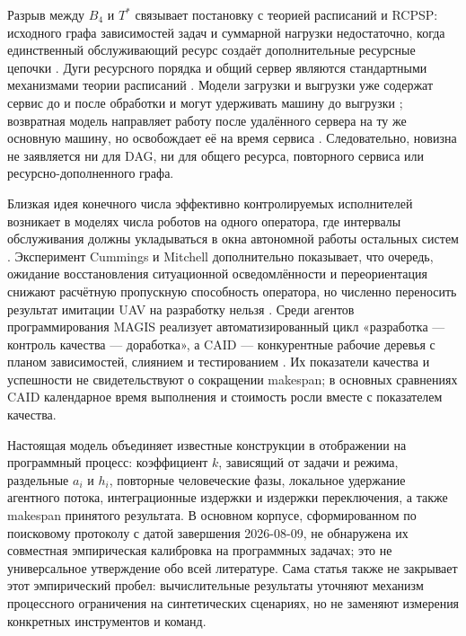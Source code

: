 Разрыв между $B_4$ и $T^*$ связывает постановку с теорией расписаний и RCPSP:
исходного графа зависимостей задач и суммарной нагрузки недостаточно, когда единственный
обслуживающий ресурс создаёт дополнительные ресурсные цепочки
\cite{graham1966bounds,brucker1999resource}. Дуги ресурсного порядка и общий
сервер являются стандартными механизмами теории расписаний
\cite{pinedo2008scheduling,hall2000parallel}. Модели загрузки и выгрузки уже
содержат сервис до и после обработки и могут удерживать машину до выгрузки
\cite{elidrissi2023loading}; возвратная модель направляет работу после удалённого
сервера на ту же основную машину, но освобождает её на время сервиса
\cite{chakhlevitch2009reentrant}. Следовательно, новизна не заявляется ни для
DAG, ни для общего ресурса, повторного сервиса или ресурсно-дополненного графа.

Близкая идея конечного числа эффективно контролируемых исполнителей возникает в
моделях числа роботов на одного оператора, где интервалы обслуживания должны укладываться в окна
автономной работы остальных систем \cite{olsen2004fanout,crandall2005validating}.
Эксперимент Cummings и Mitchell дополнительно показывает, что очередь,
ожидание восстановления ситуационной осведомлённости и переориентация снижают расчётную пропускную
способность оператора, но численно переносить результат имитации UAV на
разработку нельзя \cite{cummings2008predicting}. Среди агентов программирования
MAGIS реализует автоматизированный цикл «разработка --- контроль качества ---
доработка», а CAID --- конкурентные рабочие деревья с планом зависимостей,
слиянием и тестированием \cite{tao2024magis,geng2026caid}. Их показатели
качества и успешности не свидетельствуют о сокращении makespan; в основных
сравнениях CAID календарное время выполнения и стоимость росли вместе с
показателем качества.

Настоящая модель объединяет известные конструкции в отображении на программный
процесс: коэффициент $k$, зависящий от задачи и режима, раздельные $a_i$ и
$h_i$, повторные человеческие фазы, локальное удержание агентного потока,
интеграционные издержки и издержки переключения, а также makespan принятого
результата. В основном корпусе, сформированном по поисковому протоколу с датой
завершения 2026-08-09, не обнаружена их совместная эмпирическая калибровка на
программных задачах; это не универсальное утверждение обо всей литературе. Сама
статья также не закрывает этот эмпирический пробел: вычислительные результаты
уточняют механизм процессного ограничения на синтетических сценариях, но не
заменяют измерения конкретных инструментов и команд.

